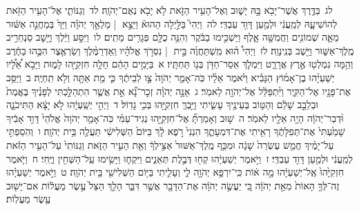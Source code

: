 \documentclass[18pt]{article}
\newcommand{\kri}[1]{\Afootnote{#1}}	%
\begin{document}
 {\loc לג~}בַּדֶּ֥רֶךְ אֲשֶׁר־יָבֹ֖א בָּ֣הּ יָשׁ֑וּב וְאֶל־הָעִ֥יר הַזֹּ֛את לֹ֥א יָבֹ֖א נְאֻם־יְהֹוָֽה׃ \startlock
 {\loc לד~}וְגַנּוֹתִ֛י אֶל־הָעִ֥יר הַזֹּ֖את לְהוֹשִׁיעָ֑הּ לְמַֽעֲנִ֔י וּלְמַ֖עַן דָּוִ֥ד עַבְדִּֽי׃ \startlock
 {\loc לה~}וַיְהִי֮ בַּלַּ֣יְלָה הַהוּא֒ וַיֵּצֵ֣א  |  מַלְאַ֣ךְ יְהֹוָ֗ה וַיַּךְ֙ בְּמַחֲנֵ֣ה אַשּׁ֔וּר מֵאָ֛ה שְׁמוֹנִ֥ים וַחֲמִשָּׁ֖ה אָ֑לֶף וַיַּשְׁכִּ֣ימוּ בַבֹּ֔קֶר וְהִנֵּ֥ה כֻלָּ֖ם פְּגָרִ֥ים מֵתִֽים׃ \startlock
 {\loc לו~}וַיִּסַּ֣ע וַיֵּ֔לֶךְ וַיָּ֖שׇׁב סַנְחֵרִ֣יב מֶֽלֶךְ־אַשּׁ֑וּר וַיֵּ֖שֶׁב בְּנִֽינְוֵֽה׃ \startlock
 {\loc לז~}וַיְהִי֩ ה֨וּא מִֽשְׁתַּחֲוֶ֜ה בֵּ֣ית  |  נִסְרֹ֣ךְ אֱלֹהָ֗יו וְֽאַדְרַמֶּ֨לֶךְ וְשַׂרְאֶ֤צֶר  \edtext{( )}{\kri{קרי ולא כתיב: [בָּנָיו֙]}}  הִכֻּ֣הוּ בַחֶ֔רֶב וְהֵ֥מָּה נִמְלְט֖וּ אֶ֣רֶץ אֲרָרָ֑ט וַיִּמְלֹ֛ךְ אֵסַר־חַדֹּ֥ן בְּנ֖וֹ תַּחְתָּֽיו׃ 
\startlock
 {\loc א~}בַּיָּמִ֣ים הָהֵ֔ם חָלָ֥ה חִזְקִיָּ֖הוּ לָמ֑וּת וַיָּבֹ֣א אֵ֠לָ֠יו יְשַׁעְיָ֨הוּ בֶן־אָמ֜וֹץ הַנָּבִ֗יא וַיֹּ֨אמֶר אֵלָ֜יו כֹּֽה־אָמַ֤ר יְהֹוָה֙ צַ֣ו לְבֵיתֶ֔ךָ כִּ֛י מֵ֥ת אַתָּ֖ה וְלֹ֥א תִֽחְיֶֽה׃ \startlock
 {\loc ב~}וַיַּסֵּ֥ב אֶת־פָּנָ֖יו אֶל־הַקִּ֑יר וַיִּ֨תְפַּלֵּ֔ל אֶל־יְהֹוָ֖ה לֵאמֹֽר׃ \startlock
 {\loc ג~}אָנָּ֣ה יְהֹוָ֗ה זְכׇר־נָ֞א אֵ֣ת אֲשֶׁ֧ר הִתְהַלַּ֣כְתִּי לְפָנֶ֗יךָ בֶּאֱמֶת֙ וּבְלֵבָ֣ב שָׁלֵ֔ם וְהַטּ֥וֹב בְּעֵינֶ֖יךָ עָשִׂ֑יתִי וַיֵּ֥בְךְּ חִזְקִיָּ֖הוּ בְּכִ֥י גָדֽוֹל׃ \startlock
 {\loc ד~}וַיְהִ֣י יְשַֽׁעְיָ֔הוּ לֹ֣א יָצָ֔א  \edtext{(העיר)}{\kri{קרי: חָצֵ֖ר}}  הַתִּיכֹנָ֑ה וּ֨דְבַר־יְהֹוָ֔ה הָיָ֥ה אֵלָ֖יו לֵאמֹֽר׃ \startlock
 {\loc ה~}שׁ֣וּב וְאָמַרְתָּ֞ אֶל־חִזְקִיָּ֣הוּ נְגִיד־עַמִּ֗י כֹּֽה־אָמַ֤ר יְהֹוָה֙ אֱלֹהֵי֙ דָּוִ֣ד אָבִ֔יךָ שָׁמַ֙עְתִּי֙ אֶת־תְּפִלָּתֶ֔ךָ רָאִ֖יתִי אֶת־דִּמְעָתֶ֑ךָ הִנְנִי֙ רֹ֣פֶא לָ֔ךְ בַּיּוֹם֙ הַשְּׁלִישִׁ֔י תַּעֲלֶ֖ה בֵּ֥ית יְהֹוָֽה׃ \startlock
 {\loc ו~}וְהֹֽסַפְתִּ֣י עַל־יָמֶ֗יךָ חֲמֵ֤שׁ עֶשְׂרֵה֙ שָׁנָ֔ה וּמִכַּ֤ף מֶֽלֶךְ־אַשּׁוּר֙ אַצִּ֣ילְךָ֔ וְאֵ֖ת הָעִ֣יר הַזֹּ֑את וְגַנּוֹתִי֙ עַל־הָעִ֣יר הַזֹּ֔את לְמַֽעֲנִ֔י וּלְמַ֖עַן דָּוִ֥ד עַבְדִּֽי׃ \startlock
 {\loc ז~}וַיֹּ֣אמֶר יְשַׁעְיָ֔הוּ קְח֖וּ דְּבֶ֣לֶת תְּאֵנִ֑ים וַיִּקְח֛וּ וַיָּשִׂ֥ימוּ עַֽל־הַשְּׁחִ֖ין וַיֶּֽחִי׃ \startlock
 {\loc ח~}וַיֹּ֤אמֶר חִזְקִיָּ֙הוּ֙ אֶֽל־יְשַׁעְיָ֔הוּ מָ֣ה א֔וֹת כִּֽי־יִרְפָּ֥א יְהֹוָ֖ה לִ֑י וְעָלִ֛יתִי בַּיּ֥וֹם הַשְּׁלִישִׁ֖י בֵּ֥ית יְהֹוָֽה׃ \startlock
 {\loc ט~}וַיֹּ֣אמֶר יְשַׁעְיָ֗הוּ זֶה־לְּךָ֤ הָאוֹת֙ מֵאֵ֣ת יְהֹוָ֔ה כִּ֚י יַעֲשֶׂ֣ה יְהֹוָ֔ה אֶת־הַדָּבָ֖ר אֲשֶׁ֣ר דִּבֵּ֑ר הָלַ֤ךְ הַצֵּל֙ עֶ֣שֶׂר מַעֲל֔וֹת אִם־יָשׁ֖וּב עֶ֥שֶׂר מַעֲלֽוֹת׃ \startlock
\end{document}
